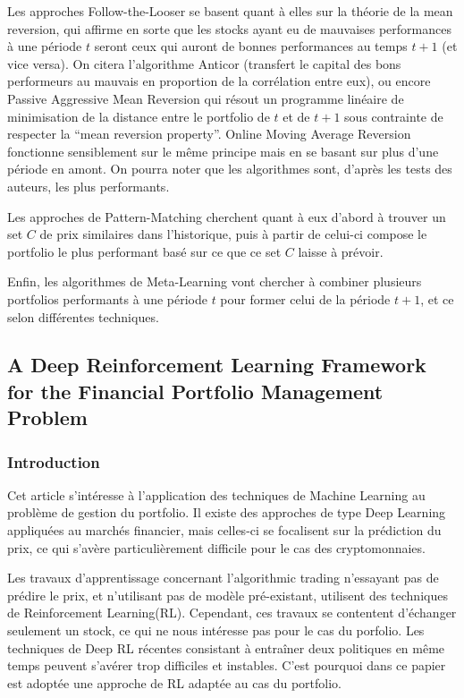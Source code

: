 \documentclass[a4paper]{article}
\begin{document}
Les approches Follow-the-Looser se basent quant à elles sur la théorie de la mean reversion, qui affirme en sorte que les stocks ayant eu de mauvaises performances à une période $t$ seront ceux qui auront de bonnes performances au temps $t+1$ (et vice versa). On citera l'algorithme Anticor (transfert le capital des bons performeurs au mauvais en proportion de la corrélation entre eux), ou encore Passive Aggressive Mean Reversion qui résout un programme linéaire de minimisation de la distance entre le portfolio de $t$ et de $t+1$ sous contrainte de respecter la ``mean reversion property''. Online Moving Average Reversion fonctionne sensiblement sur le même principe mais en se basant sur plus d'une période en amont. On pourra noter que les algorithmes sont, d'après les tests des auteurs, les plus performants.

Les approches de Pattern-Matching cherchent quant à eux d'abord à trouver un set $C$ de prix similaires dans l'historique, puis à partir de celui-ci compose le portfolio le plus performant basé sur ce que ce set $C$ laisse à prévoir.

Enfin, les algorithmes de Meta-Learning vont chercher à combiner plusieurs portfolios performants à une période $t$ pour former celui de la période $t+1$, et ce selon différentes techniques.

\subsection{A Deep Reinforcement Learning Framework for the Financial Portfolio Management Problem}

\subsubsection{Introduction}
Cet article s'intéresse à l'application des techniques de Machine Learning au problème de gestion du portfolio. Il existe des approches de type Deep Learning appliquées au marchés financier, mais celles-ci se focalisent sur la prédiction du prix, ce qui s'avère particulièrement difficile pour le cas des cryptomonnaies. 

Les travaux d'apprentissage concernant l'algorithmic trading n'essayant pas de prédire le prix, et n'utilisant pas de modèle pré-existant, utilisent des techniques de Reinforcement Learning(RL). Cependant, ces travaux se contentent d'échanger seulement un stock, ce qui ne nous intéresse pas pour le cas du porfolio. Les techniques de Deep RL récentes consistant à entraîner deux politiques en même temps peuvent s'avérer trop difficiles et instables. C'est pourquoi dans ce papier est adoptée une approche de RL adaptée au cas du portfolio. 
\end{document}
